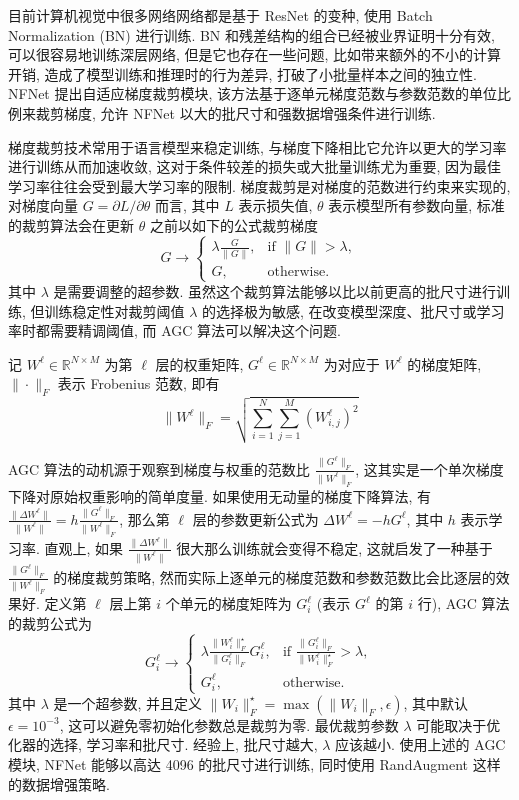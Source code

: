 \documentclass[12pt]{article}
\begin{document}
目前计算机视觉中很多网络网络都是基于 ResNet 的变种, 使用 Batch Normalization (BN) 进行训练. BN 和残差结构的组合已经被业界证明十分有效, 可以很容易地训练深层网络, 但是它也存在一些问题, 比如带来额外的不小的计算开销, 造成了模型训练和推理时的行为差异, 打破了小批量样本之间的独立性. NFNet 提出自适应梯度裁剪模块, 该方法基于逐单元梯度范数与参数范数的单位比例来裁剪梯度, 允许 NFNet 以大的批尺寸和强数据增强条件进行训练. 

梯度裁剪技术常用于语言模型来稳定训练, 与梯度下降相比它允许以更大的学习率进行训练从而加速收敛, 这对于条件较差的损失或大批量训练尤为重要, 因为最佳学习率往往会受到最大学习率的限制. 梯度裁剪是对梯度的范数进行约束来实现的, 对梯度向量 $G = \partial{L}/\partial{\theta}$ 而言, 其中 $L$ 表示损失值, $\theta$ 表示模型所有参数向量, 标准的裁剪算法会在更新 $\theta$ 之前以如下的公式裁剪梯度
\begin{equation}
  G \rightarrow
    \begin{cases}
    \lambda \frac{G}{\|G\|},& \text{if $\|G\| > \lambda$}, \\
    G, & \text{otherwise.}
    \end{cases}
\end{equation}
其中 $\lambda$ 是需要调整的超参数. 虽然这个裁剪算法能够以比以前更高的批尺寸进行训练, 但训练稳定性对裁剪阈值 $\lambda$ 的选择极为敏感, 在改变模型深度、批尺寸或学习率时都需要精调阈值, 而 AGC 算法可以解决这个问题. 

记 $W^\ell\in \mathbb{R}^{N \times M}$ 为第 $\ell$ 层的权重矩阵, $G^\ell\in \mathbb{R}^{N \times M}$ 为对应于 $W^\ell$
的梯度矩阵, $\| \cdot \|_F$ 表示 Frobenius 范数, 即有
\begin{equation}
  \|W^{\ell}\|_F = \sqrt{\sum_{i=1}^N\sum_{j=1}^M(W^{\ell}_{i,j})^2}
\end{equation} 

AGC 算法的动机源于观察到梯度与权重的范数比 $\frac{\|G^{\ell}\|_F}{\|W^{\ell}\|_F}$, 这其实是一个单次梯度下降对原始权重影响的简单度量. 如果使用无动量的梯度下降算法, 有 $\frac{\|\Delta W^{\ell}\|}{\|W^{\ell}\|} =  h \frac{\|G^{\ell}\|_F}{\|W^{\ell}\|_F}$, 那么第 $\ell$ 层的参数更新公式为 $\Delta W^{\ell} = -h G^{\ell}$, 其中 $h$ 表示学习率. 直观上, 如果 $\frac{\|\Delta W^{\ell}\|}{\|W^{\ell}\|}$ 很大那么训练就会变得不稳定, 这就启发了一种基于 $\frac{\|G^{\ell}\|_F}{\|W^{\ell}\|_F}$ 的梯度裁剪策略, 然而实际上逐单元的梯度范数和参数范数比会比逐层的效果好. 定义第 $\ell$ 层上第 $i$ 个单元的梯度矩阵为 $G_i^\ell$ (表示 $G^\ell$ 的第 $i$ 行), AGC 算法的裁剪公式为
\begin{equation}
  G^{\ell}_i \rightarrow
    \begin{cases}
    \lambda \frac{\|W^{\ell}_i\|^\star_F}{\|G^{\ell}_i\|_F}G^{\ell}_i,& \text{if $\frac{\|G^{\ell}_i\|_F}{\|W^{\ell}_i\|^\star_F} > \lambda$}, \\
    G^{\ell}_i, & \text{otherwise.}
    \end{cases}
\end{equation}
其中 $\lambda$ 是一个超参数, 并且定义 $\|W_i\|^\star_F = \max(\|W_i\|_F, \epsilon)$, 其中默认 $\epsilon = 10^{-3}$, 这可以避免零初始化参数总是裁剪为零. 最优裁剪参数 $\lambda$ 可能取决于优化器的选择, 学习率和批尺寸. 经验上, 批尺寸越大,  $\lambda$ 应该越小. 使用上述的 AGC 模块, NFNet 能够以高达 4096 的批尺寸进行训练, 同时使用 RandAugment 这样的数据增强策略. 
\end{document}
